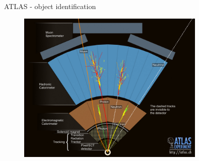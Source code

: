 \begin{frame}{ATLAS - object identification}
    \begin{figure}
        \centering
        \includegraphics[width=0.8\textwidth]{figures_theory/atlas_quer.jpg}
        \label{fig:my_label}
    \end{figure}
\end{frame}



